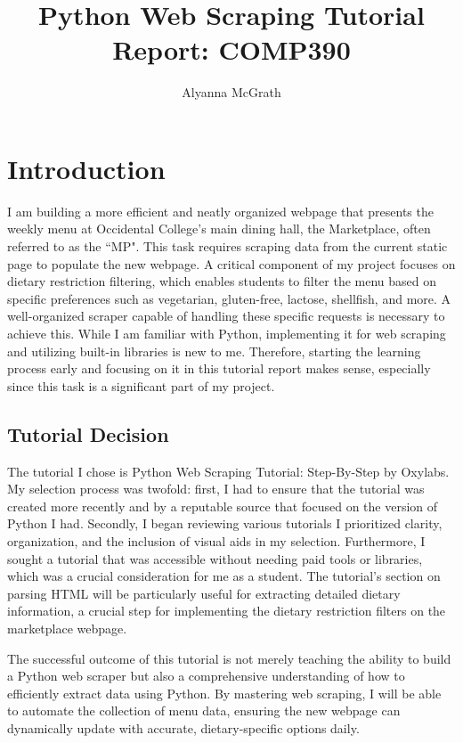 \documentclass[10pt,twocolumn]{article}
\title{Python Web Scraping Tutorial Report: COMP390}
\author{Alyanna McGrath}
\affiliation{Occidental College}
\begin{document}
\maketitle
\section{Introduction}
I am building a more efficient and neatly organized webpage that presents the weekly menu at Occidental College's main dining hall, the Marketplace, often referred to as the “MP". 
This task requires scraping data from the current static page to populate the new webpage.
A critical component of my project focuses on dietary restriction filtering, which enables students to filter the menu based on specific preferences such as vegetarian, gluten-free, lactose, shellfish, and more. 
A well-organized scraper capable of handling these specific requests is necessary to achieve this. 
While I am familiar with Python, implementing it for web scraping and utilizing built-in libraries is new to me. 
Therefore, starting the learning process early and focusing on it in this tutorial report  \cite{McGrath2024PythonWebScrapingT} makes sense, especially since this task is a significant part of my project. 
\subsection{Tutorial Decision}
The tutorial \cite{Sulcas2024PythonWebScraping} I chose is Python Web Scraping Tutorial: Step-By-Step by Oxylabs. 
My selection process was twofold: first, I had to ensure that the tutorial was created more recently and by a reputable source that focused on the version of Python I had. 
Secondly, I began reviewing various tutorials I prioritized clarity, organization, and the inclusion of visual aids in my selection.
Furthermore, I sought a tutorial that was accessible without needing paid tools or libraries, which was a crucial consideration for me as a student. 
The tutorial's section on parsing HTML will be particularly useful for extracting detailed dietary information, a crucial step for implementing the dietary restriction filters on the marketplace webpage.

The successful outcome of this tutorial is not merely teaching the ability to build a Python web scraper but also a comprehensive understanding of how to efficiently extract data using Python. By mastering web scraping, I will be able to automate the collection of menu data, ensuring the new webpage can dynamically update with accurate, dietary-specific options daily.
\end{document}
